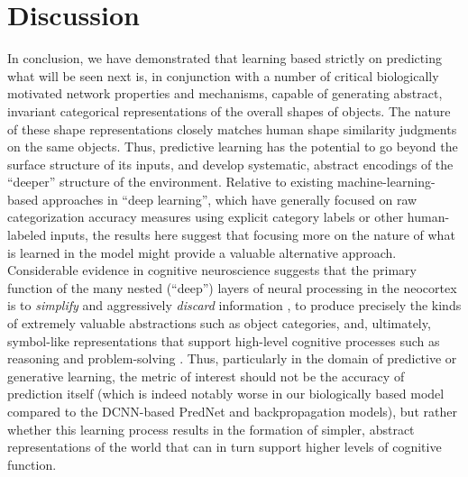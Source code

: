 \documentclass[11pt,twoside]{article}
\newif\myifpdf
\begin{document}
\section{Discussion}

In conclusion, we have demonstrated that learning based strictly on predicting what will be seen next is, in conjunction with a number of critical biologically motivated network properties and mechanisms, capable of generating abstract, invariant categorical representations of the overall shapes of objects.  The nature of these shape representations closely matches human shape similarity judgments on the same objects.  Thus, predictive learning has the potential to go beyond the surface structure of its inputs, and develop systematic, abstract encodings of the ``deeper'' structure of the environment.  Relative to existing machine-learning-based approaches in ``deep learning'', which have generally focused on raw categorization accuracy measures using explicit category labels or other human-labeled inputs, the results here suggest that focusing more on the nature of what is learned in the model might provide a valuable alternative approach.  Considerable evidence in cognitive neuroscience suggests that the primary function of the many nested (``deep'') layers of neural processing in the neocortex is to \emph{simplify} and aggressively \emph{discard} information \cite{SimonsRensink05}, to produce precisely the kinds of extremely valuable abstractions such as object categories, and, ultimately, symbol-like representations that support high-level cognitive processes such as reasoning and problem-solving \cite{RougierNoelleBraverEtAl05,OReillyPetrovCohenEtAl14}.  Thus, particularly in the domain of predictive or generative learning, the metric of interest should not be the accuracy of prediction itself (which is indeed notably worse in our biologically based model compared to the DCNN-based PredNet and backpropagation models), but rather whether this learning process results in the formation of simpler, abstract representations of the world that can in turn support higher levels of cognitive function.


\end{document}
